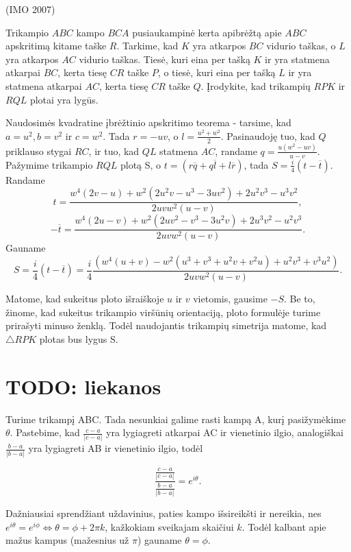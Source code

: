 \documentclass[11pt,a4paper,twoside]{book}
\begin{document}
\begin{pavnr}
(IMO 2007)

Trikampio $ABC$ kampo $BCA$ pusiaukampinė kerta apibrėžtą apie $ABC$ apskritimą kitame taške $R$. Tarkime, kad $K$ yra atkarpos $BC$ vidurio taškas, o $L$ yra atkarpos $AC$ vidurio taškas. Tiesė, kuri eina per tašką $K$ ir yra statmena atkarpai $BC$, kerta tiesę $CR$ taške $P$, o tiesė, kuri eina per tašką $L$ ir yra statmena atkarpai $AC$, kerta tiesę $CR$ taške $Q$. Įrodykite, kad trikampių $RPK$ ir $RQL$ plotai yra lygūs.
\end{pavnr}
\begin{sprendimas}

Naudosimės kvadratine įbrėžtinio apskritimo teorema - tarsime, kad $a=u^2, b=v^2$ ir $c=w^2$. Tada $r=-uv$, o $l=\frac{u^2+w^2}{2}$. Pasinaudoję tuo, kad $Q$ priklauso stygai $RC$, ir tuo, kad $QL$ statmena $AC$, randame $q=\frac{u(w^2 - uv)}{u-v}$. Pažymime trikampio $RQL$ plotą S, o $t=(r\overline{q} +q\overline{l}+l\overline{r})$, tada $S=\frac{i}{4}(t-\overline{t})$. 
Randame
$$t=\frac{w^4(2v-u) +w^2(2u^2v-u^3-3uv^2) +2u^2v^3 - u^3v^2}{2uvw^2(u-v)},$$
$$-\overline{t}=\frac{w^4(2u-v) +w^2(2uv^2-v^3-3u^2v) +2u^3v^2 - u^2v^3}{2uvw^2(u-v)}.$$
Gauname
$$S=\frac{i}{4}(t-\overline{t})=\frac{i}{4}\frac{(w^4(u+v)-w^2(u^3+v^3+u^2v+v^2u)+u^2v^3+v^3u^2)}{2uvw^2(u-v)}.$$

Matome, kad sukeitus ploto išraiškoje $u$ ir $v$ vietomis, gausime $-S$. Be to, žinome, kad sukeitus trikampio viršūnių orientaciją, ploto formulėje turime prirašyti minuso ženklą. Todėl naudojantis trikampių simetrija matome, kad $\triangle RPK$ plotas bus lygus S.
\end{sprendimas}





\section{TODO: liekanos}

Turime trikampį ABC. Tada nesunkiai galime rasti kampą A, kurį pasižymėkime $\theta$. Pastebime, kad $\frac{c-a}{|c-a|}$ yra lygiagreti atkarpai AC ir vienetinio ilgio, analogiškai $\frac{b-a}{|b-a|}$ yra lygiagreti AB ir vienetinio ilgio, todėl 

$$\dfrac{\displaystyle \frac{c-a}{|c-a|}}{\displaystyle \frac{b-a}{|b-a|}}=e^{i\theta}.$$

Dažniausiai sprendžiant uždavinius, paties kampo išsireikšti ir nereikia, nes $e^{i\theta} = e^{i\phi} \Leftrightarrow \theta = \phi + 2\pi k$, kažkokiam sveikajam skaičiui $k$. Todėl kalbant apie mažus kampus (mažesnius už $\pi$) gauname $\theta = \phi $.
\end{document}

